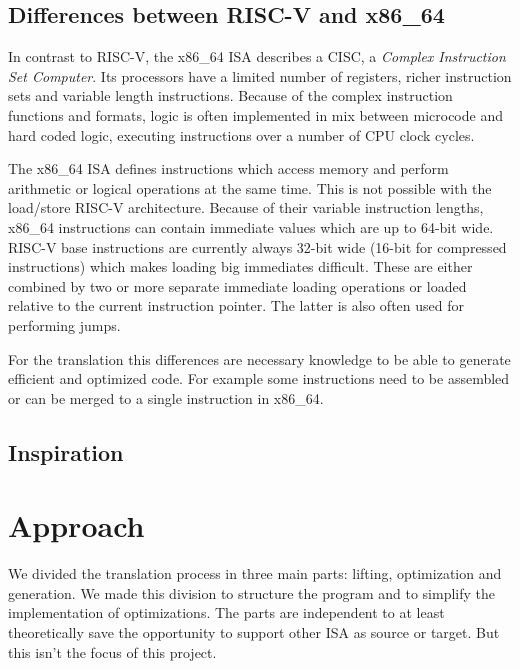 \documentclass[course=eragp]{aspdoc}
\begin{document}
\subsection{Differences between RISC-V and x86\_64}
In contrast to RISC-V, the x86\_64 ISA describes a CISC, a \emph{Complex Instruction Set Computer}.
Its processors have a limited number of registers, richer instruction sets and variable length
instructions. Because of the complex instruction functions and formats, logic is often implemented
in mix between microcode and hard coded logic, executing instructions over a number of CPU clock
cycles.\cite{RISCvCISC}

\par

The x86\_64 ISA defines instructions which access memory and perform arithmetic or logical
operations at the same time. This is not possible with the load/store RISC-V architecture. Because
of their variable instruction lengths, x86\_64 instructions can contain immediate values which are
up to 64-bit wide.\cite[Vol.~2B~p.~4-35]{intel2017man} RISC-V base instructions are currently always
32-bit wide (16-bit for compressed instructions)\cite[p.~8]{rvspec} which makes loading big
immediates difficult. These are either combined by two or more separate immediate loading operations
or loaded relative to the current instruction pointer.\cite[p.~19]{rvspec} The latter is also often
used for performing jumps.\cite [p.~20]{rvspec}

\par

For the translation this differences are necessary knowledge to be able to generate efficient and
optimized code. For example some instructions need to be assembled or can be merged to a single
instruction in x86\_64.

\subsection{Inspiration}

\section{Approach}\label{approach_section}

We divided the translation process in three main parts: lifting, optimization and generation. We
made this division to structure the program and to simplify the implementation of optimizations.
The parts are independent to at least theoretically save the opportunity to support other ISA as
source or target. But this isn't the focus of this project.
\end{document}
